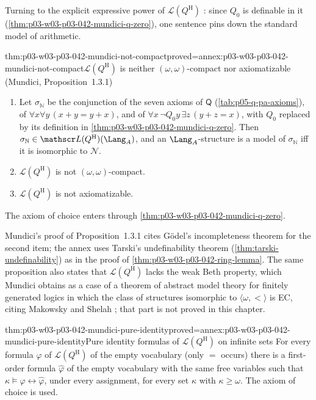 Turning to the explicit expressive power of \(\mathscr L(Q^{\mathrm H})\)
\cite[p.~216]{Mundici1985OtherQuantifiers}: since \(Q_0\) is definable in
it (\cref{thm:p03-w03-p03-042-mundici-q-zero}), one sentence pins down the
standard model of arithmetic.

\begin{hbtheorem}{thm:p03-w03-p03-042-mundici-not-compact}{proved=annex:p03-w03-p03-042-mundici-not-compact}{\(\mathscr L(Q^{\mathrm H})\) is neither \((\omega,\omega)\)-compact nor axiomatizable (Mundici, Proposition~1.3.1)}
\begin{enumerate}
\item Let \(\sigma_{\mathbb N}\) be the conjunction of the seven axioms of
      \(\mathsf Q\) (\cref{tab:p05-q-pa-axioms}), of
      \(\forall x\forall y\,(x+y=y+x)\), and of \(\forall x\,\neg Q_0y\,
      \exists z\,(y+z=x)\), with \(Q_0\) replaced by its definition in
      \cref{thm:p03-w03-p03-042-mundici-q-zero}.  Then
      \(\sigma_{\mathbb N}\in\mathscr L(Q^{\mathrm H})(\Lang_A)\), and an
      \(\Lang_A\)-structure is a model of \(\sigma_{\mathbb N}\) iff it is
      isomorphic to \(\mathcal N\).
\item \(\mathscr L(Q^{\mathrm H})\) is not \((\omega,\omega)\)-compact.
\item \(\mathscr L(Q^{\mathrm H})\) is not axiomatizable.
\end{enumerate}
The axiom of choice enters through
\cref{thm:p03-w03-p03-042-mundici-q-zero}.
\end{hbtheorem}

Mundici's proof of Proposition~1.3.1 cites G\"odel's incompleteness
theorem for the second item; the annex uses Tarski's undefinability
theorem (\cref{thm:tarski-undefinability}) as in the proof of
\cref{thm:p03-w03-p03-042-ring-lemma}.  The same proposition also states
that \(\mathscr L(Q^{\mathrm H})\) lacks the weak Beth property, which
Mundici obtains as a case of a theorem of abstract model theory for
finitely generated logics in which the class of structures isomorphic to
\(\langle\omega,<\rangle\) is EC, citing Makowsky and Shelah
\cite[p.~216]{Mundici1985OtherQuantifiers}; that part is not proved in
this chapter.

\begin{hbtheorem}{thm:p03-w03-p03-042-mundici-pure-identity}{proved=annex:p03-w03-p03-042-mundici-pure-identity}{Pure identity formulas of \(\mathscr L(Q^{\mathrm H})\) on infinite sets}
For every formula \(\varphi\) of \(\mathscr L(Q^{\mathrm H})\) of the
empty vocabulary (only \(=\) occurs) there is a first-order formula
\(\hat\varphi\) of the empty vocabulary with the same free variables such
that \(\kappa\models\varphi\leftrightarrow\hat\varphi\), under every
assignment, for every set \(\kappa\) with \(\kappa\geq\omega\).  The axiom
of choice is used.
\end{hbtheorem}

